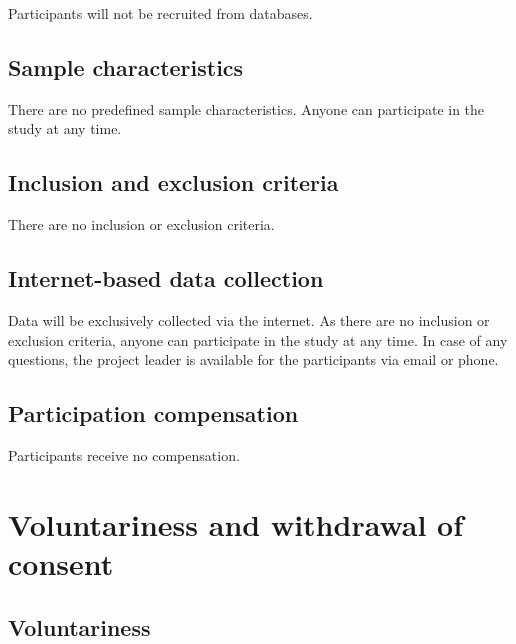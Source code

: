 \documentclass[11pt,twoside,a4paper]{article}
\begin{document}
Participants will not be recruited from databases.

\subsection{Sample characteristics}

There are no predefined sample characteristics.
Anyone can participate in the study at any time.

\subsection{Inclusion and exclusion criteria}

There are no inclusion or exclusion criteria.

\subsection{Internet-based data collection}


Data will be exclusively collected via the internet.
As there are no inclusion or exclusion criteria, anyone can participate in the study at any time.
In case of any questions, the project leader is available for the participants via email or phone.

\subsection{Participation compensation}


Participants receive no compensation.

\section{Voluntariness and withdrawal of consent}

\subsection{Voluntariness}

\end{document}
